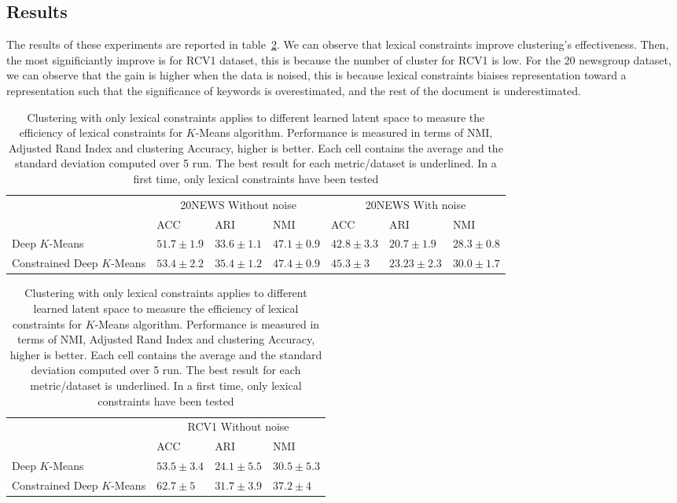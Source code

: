 \subsection{Results}
The results of these experiments are reported in table~\ref{tab:res}. We can  
observe that lexical constraints improve clustering's effectiveness. Then,
the most significiantly improve is for RCV1 dataset, this is because the number
of cluster for RCV1 is low. For the 20 newsgroup dataset, we can observe that 
the gain is higher when the data is noised, this is because lexical constraints
biaises representation toward a representation such that the significance of 
keywords is overestimated, and the rest of the document is underestimated.   

\begin{table}[!h]
\centering
  \begin{tabular}{| l | l | l | l | l | l | l | }
    \hline
    & \multicolumn{3}{|c|}{20NEWS Without noise} & \multicolumn{3}{|c|}{20NEWS With noise}  \\
    & ACC            &ARI             & NMI            & ACC           & ARI           &NMI            \\ \hline
Deep $K$-Means &$51.7\pm 1.9$&$33.6\pm 1.1$&$47.1\pm 0.9$&$42.8\pm 3.3$&$20.7\pm 1.9$&$28.3\pm 0.8$\\ \hline
Constrained Deep $K$-Means&\boldmath$53.4\pm 2.2$&\boldmath$35.4\pm 1.2$&\boldmath$47.4\pm 0.9$&\boldmath$45.3\pm 3$&\boldmath$23.23\pm 2.3$&\boldmath$30.0\pm 1.7$\\ \hline
  \end{tabular}
\begin{tabular}{| l | l | l | l | }
    \hline
     & \multicolumn{3}{|c|}{RCV1 Without noise}  \\
    &ACC            & ARI           &NMI  \\ \hline
Deep $K$-Means &$53.5\pm 3.4$&$24.1\pm 5.5$&$30.5\pm 5.3$
\\ \hline
Constrained Deep $K$-Means&\boldmath$62.7\pm 5$&\boldmath$31.7\pm 3.9$&\boldmath$37.2\pm 4$
\\ \hline
  \end{tabular}
\caption{\label{tab:res}Clustering with only lexical constraints applies to 
different learned latent space to measure the efficiency of lexical constraints
for $K$-Means algorithm. Performance is measured in terms of NMI, Adjusted Rand 
Index and clustering Accuracy, higher is better. Each cell contains the average
and the standard deviation computed over 5 run. The best result for each 
metric/dataset is underlined. In a first time, only lexical constraints have 
been tested}
\end{table}
